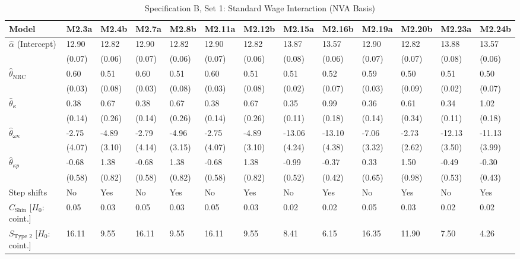 \FloatBarrier
\begin{table}[h!]
	\centering
	\caption{Specification B, Set 1: Standard Wage Interaction (NVA Basis)}
	\label{tab:specB_set1_nva_app}
	\tiny
	\setlength{\tabcolsep}{1.5pt}
	\begin{tabular}{p{3.2cm}p{1.0cm}p{1.0cm}p{1.0cm}p{1.0cm}p{1.0cm}p{1.0cm}p{1.0cm}p{1.0cm}p{1.0cm}p{1.0cm}p{1.0cm}p{1.0cm}}
		\toprule
		Model & M2.3a & M2.4b & M2.7a & M2.8b & M2.11a & M2.12b & M2.15a & M2.16b & M2.19a & M2.20b & M2.23a & M2.24b \\
		\midrule
		$\hat{\alpha}$ (Intercept) & 12.90 & 12.82 & 12.90 & 12.82 & 12.90 & 12.82 & 13.87 & 13.57 & 12.90 & 12.82 & 13.88 & 13.57 \\
		& (0.07) & (0.06) & (0.07) & (0.06) & (0.07) & (0.06) & (0.08) & (0.06) & (0.07) & (0.07) & (0.08) & (0.06) \\
		$\hat{\theta}_{\text{NRC}}$ & 0.60 & 0.51 & 0.60 & 0.51 & 0.60 & 0.51 & 0.51 & 0.52 & 0.59 & 0.50 & 0.51 & 0.50 \\
		& (0.03) & (0.08) & (0.03) & (0.08) & (0.03) & (0.08) & (0.02) & (0.07) & (0.03) & (0.09) & (0.02) & (0.07) \\
		$\hat{\theta}_{\kappa}$ & 0.38 & 0.67 & 0.38 & 0.67 & 0.38 & 0.67 & 0.35 & 0.99 & 0.36 & 0.61 & 0.34 & 1.02 \\
		& (0.14) & (0.26) & (0.14) & (0.26) & (0.14) & (0.26) & (0.11) & (0.18) & (0.14) & (0.34) & (0.11) & (0.18) \\
		$\hat{\theta}_{\omega\kappa}$ & -2.75 & -4.89 & -2.79 & -4.96 & -2.75 & -4.89 & -13.06 & -13.10 & -7.06 & -2.73 & -12.13 & -11.13 \\
		& (4.07) & (3.10) & (4.14) & (3.15) & (4.07) & (3.10) & (4.24) & (4.38) & (3.32) & (2.62) & (3.50) & (3.99) \\
		$\hat{\theta}_{\kappa p}$ & -0.68 & 1.38 & -0.68 & 1.38 & -0.68 & 1.38 & -0.99 & -0.37 & 0.33 & 1.50 & -0.49 & -0.30 \\
		& (0.58) & (0.82) & (0.58) & (0.82) & (0.58) & (0.82) & (0.52) & (0.42) & (0.65) & (0.98) & (0.53) & (0.43) \\
		\midrule
		Step shifts & No & Yes & No & Yes & No & Yes & No & Yes & No & Yes & No & Yes \\
		$C_{\text{Shin}}$ [$H_0$: coint.] & 0.05 & 0.03 & 0.05 & 0.03 & 0.05 & 0.03 & 0.02 & 0.02 & 0.05 & 0.03 & 0.02 & 0.02 \\
		$S_{\text{Type 2}}$ [$H_0$: coint.] & 16.11 & 9.55 & 16.11 & 9.55 & 16.11 & 9.55 & 8.41 & 6.15 & 16.35 & 11.90 & 7.50 & 4.26 \\

\end{tabular}
\end{table}
